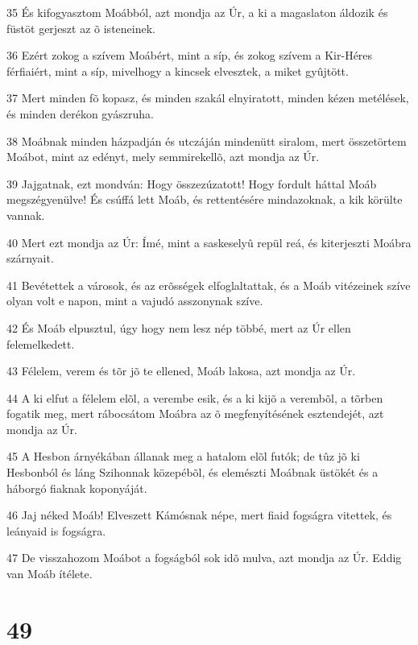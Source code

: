 \par 35 És kifogyasztom Moábból, azt mondja az Úr, a ki a magaslaton áldozik és füstöt gerjeszt az õ isteneinek.
\par 36 Ezért zokog a szívem Moábért, mint a síp, és zokog szívem a Kir-Héres férfiaiért, mint a síp, mivelhogy a kincsek elvesztek, a miket gyûjtött.
\par 37 Mert minden fõ kopasz, és minden szakál elnyiratott, minden kézen metélések, és minden derékon gyászruha.
\par 38 Moábnak minden házpadján és utczáján mindenütt siralom, mert összetörtem Moábot, mint az edényt, mely semmirekellõ, azt mondja az Úr.
\par 39 Jajgatnak, ezt mondván: Hogy összezúzatott! Hogy fordult háttal Moáb megszégyenülve! És csúffá lett Moáb, és rettentésére mindazoknak, a kik körülte vannak.
\par 40 Mert ezt mondja az Úr: Ímé, mint a saskeselyû repül reá, és kiterjeszti Moábra szárnyait.
\par 41 Bevétettek a városok, és az erõsségek elfoglaltattak, és a Moáb vitézeinek szíve olyan volt e napon, mint a vajudó asszonynak szíve.
\par 42 És Moáb elpusztul, úgy hogy nem lesz nép többé, mert az Úr ellen felemelkedett.
\par 43 Félelem, verem és tõr jõ te ellened, Moáb lakosa, azt mondja az Úr.
\par 44 A ki elfut a félelem elõl, a verembe esik, és a ki kijõ a verembõl, a tõrben fogatik meg, mert rábocsátom Moábra az õ megfenyítésének esztendejét, azt mondja az Úr.
\par 45 A Hesbon árnyékában állanak meg a hatalom elõl futók; de tûz jõ ki Hesbonból és láng Szihonnak közepébõl, és elemészti Moábnak üstökét és a háborgó fiaknak koponyáját.
\par 46 Jaj néked Moáb! Elveszett Kámósnak népe, mert fiaid fogságra vitettek, és leányaid is fogságra.
\par 47 De visszahozom Moábot a fogságból sok idõ mulva, azt mondja az Úr. Eddig van Moáb ítélete.

\chapter{49}

